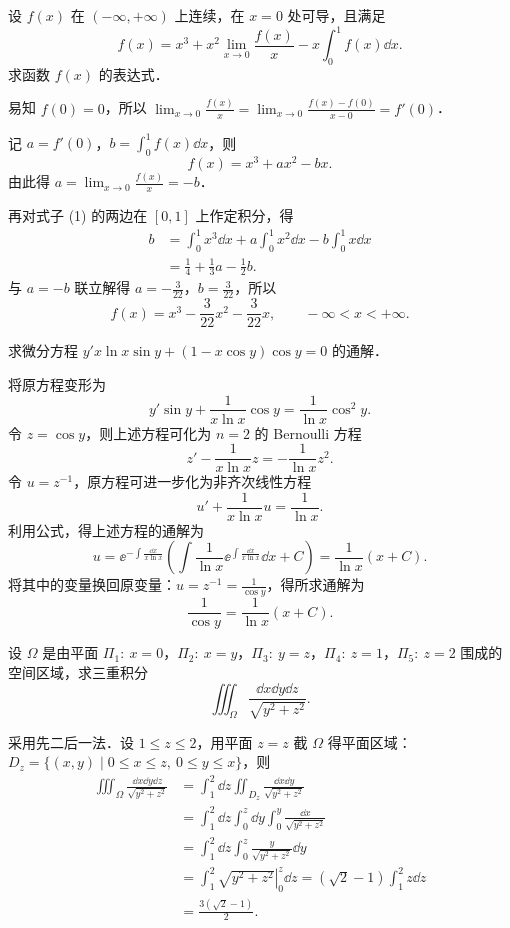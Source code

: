 设 $f(x)$ 在 $(-\infty,+\infty)$ 上连续，在 $x=0$ 处可导，且满足
\[
  f(x)=x^3+x^2\lim_{x\to 0}\frac{f(x)}{x}-x\int_0^1 f(x)\dd x.
\]
求函数 $f(x)$ 的表达式．
\begin{solution}
  易知 $f(0)=0$，所以 $\displaystyle \lim_{x\to 0}\frac{f(x)}{x}=\lim_{x\to 0}\frac{f(x)-f(0)}{x-0}=f'(0)$．

  记 $a=f'(0)$，$b=\displaystyle\int_0^1 f(x)\dd x$，则
  \begin{equation}
    f(x)=x^3+ax^2-bx. \tag{1}
  \end{equation}
  由此得 $a=\displaystyle \lim_{x\to 0}\frac{f(x)}{x}=-b$．

  再对式子 (1) 的两边在 $[0,1]$ 上作定积分，得
  \begin{align*}
    b&=\int_0^1 x^3\dd x+a\int_0^1 x^2\dd x-b\int_0^1 x\dd x\\
    &=\frac{1}{4}+\frac{1}{3}a-\frac{1}{2}b.
  \end{align*}
  与 $a=-b$ 联立解得 $a=-\frac{3}{22}$，$b=\frac{3}{22}$，所以
  \[
    f(x)=x^3-\frac{3}{22}x^2-\frac{3}{22}x,\qquad -\infty<x<+\infty.
  \]
\end{solution}

求微分方程 $y'x\ln x\sin y+(1-x\cos y)\cos y=0$ 的通解．
\begin{solution}
  将原方程变形为
  \begin{equation}
    y'\sin y+\frac{1}{x\ln x}\cos y=\frac{1}{\ln x}\cos^2 y. \tag{1}
  \end{equation}
  令 $z=\cos y$，则上述方程可化为 $n=2$ 的 Bernoulli 方程
  \[
    z'-\frac{1}{x\ln x}z=-\frac{1}{\ln x}z^2.
  \]
  令 $u=z^{-1}$，原方程可进一步化为非齐次线性方程
  \[
    u'+\frac{1}{x\ln x}u=\frac{1}{\ln x}.
  \]
  利用公式，得上述方程的通解为
  \[
    u=\ee^{-\int\frac{\dd x}{x\ln x}}
    \left(\int\frac{1}{\ln x}\ee^{\int\frac{\dd x}{x\ln x}}\dd x+C\right)
    =\frac{1}{\ln x}(x+C).
  \]
  将其中的变量换回原变量：$u=z^{-1}=\frac{1}{\cos y}$，得所求通解为
  \[
    \frac{1}{\cos y}=\frac{1}{\ln x}(x+C).
  \]
\end{solution}

设 $\Omega$ 是由平面 $\Pi_1:\ x=0$，$\Pi_2:\ x=y$，$\Pi_3:\ y=z$，$\Pi_4:\ z=1$，$\Pi_5:\ z=2$ 围成的空间区域，求三重积分
\[
  \iiint_{\Omega}\frac{\dd x\dd y\dd z}{\sqrt{y^2+z^2}}.
\]
\begin{solution}
  采用先二后一法．设 $1\le z\le 2$，用平面 $z=z$ 截 $\Omega$ 得平面区域：$D_z=\{(x,y)\mid 0\le x\le z,\ 0\le y\le x\}$，则
  \begin{align*}
    \iiint_{\Omega}\frac{\dd x\dd y\dd z}{\sqrt{y^2+z^2}}
    &=\int_1^2 \dd z\iint_{D_z}\frac{\dd x\dd y}{\sqrt{y^2+z^2}}\\
    &=\int_1^2 \dd z\int_0^z \dd y\int_0^y \frac{\dd x}{\sqrt{y^2+z^2}}\\
    &=\int_1^2 \dd z\int_0^z \frac{y}{\sqrt{y^2+z^2}}\dd y\\
    &=\int_1^2 \left.\sqrt{y^2+z^2}\right|_0^z \dd z
      =(\sqrt{2}-1)\int_1^2 z\dd z\\
    &=\frac{3(\sqrt{2}-1)}{2}.
  \end{align*}
\end{solution}

